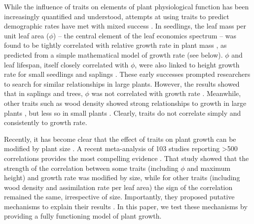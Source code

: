 \documentclass[9pt,twocolumn,twoside]{pnas-new}
\begin{document}
While the influence of traits on elements of plant physiological function has been increasingly quantified and understood, attempts at using traits to predict demographic rates have met with mixed success \citep{Poorter-2006, Poorter-2008,Wright-2010,Herault-2011,Paine-2015}. In seedlings, the leaf mass per unit leaf area ($\phi$) -- the central element of the leaf economics spectrum \citep{Wright-2004} -- was found to be tightly correlated with relative growth rate in plant mass \citep{Lambers-1992, Cornelissen-1996, Wright-2000}, as predicted from a simple mathematical model of growth rate (see below). $\phi$ and leaf lifespan, itself closely correlated with $\phi$, were also linked to height growth rate for small seedlings and saplings \citep{Reich-1992, Poorter-2006}. These early successes prompted researchers to search for similar relationships in large plants. However, the results showed that in saplings and trees, $\phi$ was not correlated with growth rate \citep{Poorter-2008, Wright-2010, Herault-2011, Paine-2015}. Meanwhile, other traits such as wood density showed strong relationships to growth in large plants \citep{Wright-2010,Herault-2011}, but less so in small plants \citep{Castro-1998}. Clearly, traits do not correlate simply and consistently to growth rate.

Recently, it has become clear that the effect of traits on plant growth can be modified by plant size \citep{Falster-2011, Ruger-2012, Iida-2014, Visser-2016, Gibert-2016}. A recent meta-analysis of 103 studies reporting \textgreater 500 correlations provides the most compelling evidence \citep{Gibert-2016}. That study showed that the strength of the correlation between some traits (including $\phi$ and maximum height) and growth rate was modified by size, while for other traits (including wood density and assimilation rate per leaf area) the sign of the correlation remained the same, irrespective of size. Importantly, they proposed putative mechanisms to explain their results \citep{Gibert-2016}. In this paper, we test these mechanisms by providing a fully functioning model of plant growth.
\end{document}
